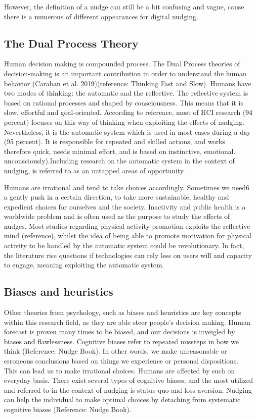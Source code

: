 However, the definition of a nudge can still be a bit confusing and vague, cause there is a numerous of different appearances for digital nudging. 

\subsection{The Dual Process Theory}
Human decision making is compounded process. The Dual Process theories of decision-making is an important contribution in order to understand the human behavior (Caraban et al. 2019)(reference:  Thinking Fast and Slow). Humans have two modes of thinking: the automatic and the reflective. The reflective system is based on rational processes and shaped by consciousness. This means that it is slow, effortful and goal-oriented. According to reference, most of HCI research (94 percent) focuses on this way of thinking when exploiting the effects of nudging. Nevertheless, it is the automatic system which is used in most cases during a day (95 percent). It is responsible for repeated and skilled actions, and works therefore quick, needs minimal effort, and is based on instinctive, emotional.  unconsciously).Including research on the automatic system in the context of nudging, is referred to as an untapped areas of opportunity.

Humans are irrational and tend to take choices accordingly. Sometimes we need6
a gently push in a certain direction, to take more sustainable, healthy and expedient choices for ourselves and the society. Inactivity and public health is a worldwide problem  and  is  often  used  as  the  purpose  to  study  the  effects  of  nudges.   Most  studies regarding physical activity promotion exploits the reflective mind (reference), whilst the idea of being able to promote motivation for physical activity to be handled by the automatic system could be revolutionary. In fact,  the literature rise questions if technologies can rely less on users will and capacity to engage, meaning exploiting the automatic system.

\subsection{Biases and heuristics }
Other theories from psychology, such as biases and heuristics are key concepts within this research field, as they are able steer people's decision making. Human forecast is proven many times to be biased, and our decisions is inveigled by biases and flawlessness. Cognitive biases refer to repeated missteps in how we think (Reference: Nudge Book). In other words, we make unreasonable or erroneous conclusions based on things we experience or personal dispositions. This can lead us to make irrational choices. Humans are affected by such on everyday basis. There exist several types of cognitive biases, and the most utilized and referred to in the context of nudging is status quo and loss aversion. Nudging can help the individual to make optimal choices by detaching from systematic cognitive biases (Reference: Nudge Book). 

